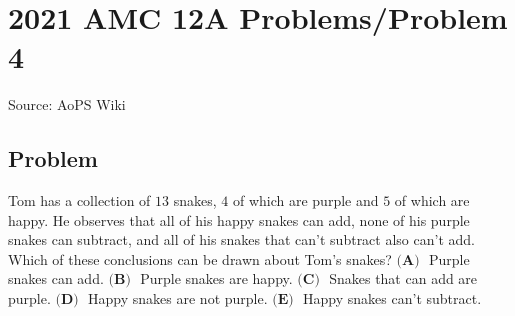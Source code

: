 \documentclass[12pt]{article}
\begin{document}
\section*{{2021 AMC 12A Problems/Problem 4}}
Source: AoPS Wiki

\subsection*{Problem}
Tom has a collection of $13$ snakes, $4$ of which are purple and $5$ of which are happy. He observes that all of his happy snakes can add, none of his purple snakes can subtract, and all of his snakes that can't subtract also can't add. Which of these conclusions can be drawn about Tom's snakes? $\textbf{(A) }$ Purple snakes can add. $\textbf{(B) }$ Purple snakes are happy. $\textbf{(C) }$ Snakes that can add are purple. $\textbf{(D) }$ Happy snakes are not purple. $\textbf{(E) }$ Happy snakes can't subtract.
\end{document}
